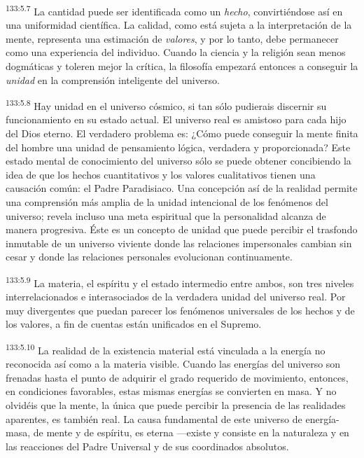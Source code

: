 \par
\textsuperscript{133:5.7} La cantidad puede ser identificada como un \textit{hecho}, convirtiéndose así en una uniformidad científica. La calidad, como está sujeta a la interpretación de la mente, representa una estimación de \textit{valores}, y por lo tanto, debe permanecer como una experiencia del individuo. Cuando la ciencia y la religión sean menos dogmáticas y toleren mejor la crítica, la filosofía empezará entonces a conseguir la \textit{unidad} en la comprensión inteligente del universo.

\par
\textsuperscript{133:5.8} Hay unidad en el universo cósmico, si tan sólo pudierais discernir su funcionamiento en su estado actual. El universo real es amistoso para cada hijo del Dios eterno. El verdadero problema es: ¿Cómo puede conseguir la mente finita del hombre una unidad de pensamiento lógica, verdadera y proporcionada? Este estado mental de conocimiento del universo sólo se puede obtener concibiendo la idea de que los hechos cuantitativos y los valores cualitativos tienen una causación común: el Padre Paradisiaco. Una concepción así de la realidad permite una comprensión más amplia de la unidad intencional de los fenómenos del universo; revela incluso una meta espiritual que la personalidad alcanza de manera progresiva. Éste es un concepto de unidad que puede percibir el trasfondo inmutable de un universo viviente donde las relaciones impersonales cambian sin cesar y donde las relaciones personales evolucionan continuamente.

\par
\textsuperscript{133:5.9} La materia, el espíritu y el estado intermedio entre ambos, son tres niveles interrelacionados e interasociados de la verdadera unidad del universo real. Por muy divergentes que puedan parecer los fenómenos universales de los hechos y de los valores, a fin de cuentas están unificados en el Supremo.

\par
\textsuperscript{133:5.10} La realidad de la existencia material está vinculada a la energía no reconocida así como a la materia visible. Cuando las energías del universo son frenadas hasta el punto de adquirir el grado requerido de movimiento, entonces, en condiciones favorables, estas mismas energías se convierten en masa. Y no olvidéis que la mente, la única que puede percibir la presencia de las realidades aparentes, es también real. La causa fundamental de este universo de energía-masa, de mente y de espíritu, es eterna ---existe y consiste en la naturaleza y en las reacciones del Padre Universal y de sus coordinados absolutos.

